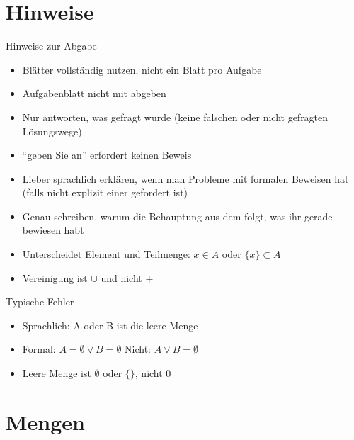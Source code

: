 \documentclass[]{beamer}
\begin{document}

\begin{frame}
	\titlepage
\end{frame}

\section{Hinweise}

\begin{frame}{Hinweise zur Abgabe}
	\begin{itemize}
		\item Blätter vollständig nutzen, nicht ein Blatt pro Aufgabe
		\item Aufgabenblatt nicht mit abgeben
		\item Nur antworten, was gefragt wurde (keine falschen oder nicht gefragten Lösungswege)
		\item "`geben Sie an"' erfordert keinen Beweis
		\item Lieber sprachlich erklären, wenn man Probleme mit formalen Beweisen hat (falls nicht explizit einer gefordert ist)
		\item Genau schreiben, warum die Behauptung aus dem folgt, was ihr gerade bewiesen habt
		\item Unterscheidet Element und Teilmenge: $x \in A$ oder $\{x\} \subset A$
		\item Vereinigung ist $\cup$ und nicht $+$
	\end{itemize}
\end{frame}

\begin{frame}{Typische Fehler}
	\begin{itemize}
		\item Sprachlich: A oder B ist die leere Menge
		\item Formal: $A = \emptyset \lor B = \emptyset$ Nicht: $A \lor B = \emptyset$
		\item Leere Menge ist $\emptyset $ oder $\{\}$, nicht 0
	\end{itemize}
\end{frame}

\section{Mengen}
\end{document}
